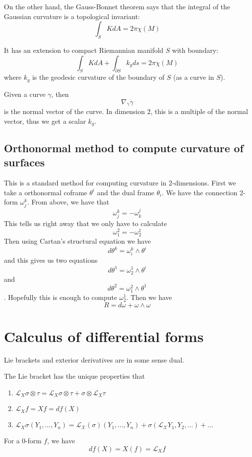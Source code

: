 \documentclass[main.tex]{subfiles}
\begin{document}
On the other hand, the Gauss-Bonnet theorem says that the integral of the Gaussian curvature is a topological invariant:
$$
\int_S K dA = 2 \pi \chi(M)
$$

It has an extension to compact Riemannian manifold $S$ with boundary:
$$
\int_S K dA + \int_{\partial S}k_g ds = 2\pi \chi(M)
$$
where $k_g$ is the geodesic curvature of the boundary of $S$ (as a curve in $S$).

Given a curve $\gamma$, then 
$$
\nabla_{\dot{\gamma}} \dot{\gamma}
$$
is the normal vector of the curve. In dimension 2, this is a multiple of the normal vector, thus we get a scalar $k_g$.

\subsection{Orthonormal method to compute curvature of surfaces}
This is a standard method for computing curvature in 2-dimensions. First we take a orthonormal coframe $\theta^i$ and the dual frame $\theta_i$. We have the connection 2-form $\omega_j ^k$. From above, we have that 
$$
\omega_j ^k = - \omega_k ^j
$$
This tells us right away that we only have to calculate 
$$
\omega_1 ^2 = - \omega_2 ^1
$$
Then using Cartan's structural equation we have $$
d\theta^k = \omega^k _i \wedge \theta^i
$$
and this gives us two equations
$$
d\theta^1 = \omega^1 _2 \wedge \theta^i
$$ and 
$$
d\theta^2 = \omega^2 _1 \wedge \theta^1
$$. 
Hopefully this is enough to compute $\omega^1_2$. Then we have 
$$
R = d \omega + \omega \wedge \omega
$$


\section{Calculus of differential forms}
Lie brackets and exterior derivatives are in some sense dual.

The Lie bracket has the unique properties  that 
\begin{enumerate}
    \item $\mathcal{L}_X \sigma \otimes \tau = \mathcal{L}_X \sigma \otimes \tau + \sigma \otimes \mathcal{L}_X \tau$
    \item $\mathcal{L}_X f = X f = df (X)$
    \item $\mathcal{L}_X \sigma(Y_1, ..., Y_n) = \mathcal{L_X} (\sigma)(Y_1, ..., Y_n) + \sigma (\mathcal{L_X}Y_1, Y_2,...) + ...$
\end{enumerate}

For a 0-form $f$, we have 
$$
df(X) = X(f) = \mathcal{L}_X f
$$
\end{document}
